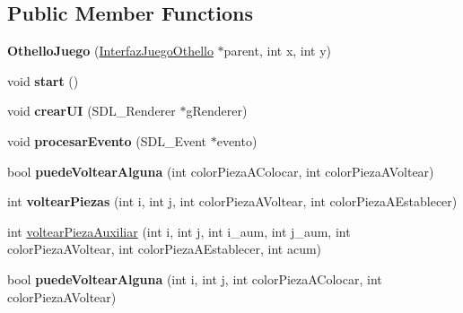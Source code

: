 \subsection*{Public Member Functions}
\begin{DoxyCompactItemize}
\item 
{\bfseries Othello\+Juego} (\hyperlink{class_interfaz_juego_othello}{Interfaz\+Juego\+Othello} $\ast$parent, int x, int y)\hypertarget{class_othello_juego_ad2e03afd54f02fda63eb7d11452ac2db}{}\label{class_othello_juego_ad2e03afd54f02fda63eb7d11452ac2db}

\item 
void {\bfseries start} ()\hypertarget{class_othello_juego_a08758b59df118a4cb372b91ffb0a375e}{}\label{class_othello_juego_a08758b59df118a4cb372b91ffb0a375e}

\item 
void {\bfseries crear\+UI} (S\+D\+L\+\_\+\+Renderer $\ast$g\+Renderer)\hypertarget{class_othello_juego_a87f0de7ee9c8e630f6dd33a55bb89a7b}{}\label{class_othello_juego_a87f0de7ee9c8e630f6dd33a55bb89a7b}

\item 
void {\bfseries procesar\+Evento} (S\+D\+L\+\_\+\+Event $\ast$evento)\hypertarget{class_othello_juego_a5f22f33d7b92f67fe3b2a840202137d8}{}\label{class_othello_juego_a5f22f33d7b92f67fe3b2a840202137d8}

\item 
bool {\bfseries puede\+Voltear\+Alguna} (int color\+Pieza\+A\+Colocar, int color\+Pieza\+A\+Voltear)\hypertarget{class_othello_juego_aebef4a995b0ac04e7ba589b45986791f}{}\label{class_othello_juego_aebef4a995b0ac04e7ba589b45986791f}

\item 
int {\bfseries voltear\+Piezas} (int i, int j, int color\+Pieza\+A\+Voltear, int color\+Pieza\+A\+Establecer)\hypertarget{class_othello_juego_a60ff2a675a6144cef2668ffd61bcf08a}{}\label{class_othello_juego_a60ff2a675a6144cef2668ffd61bcf08a}

\item 
int \hyperlink{class_othello_juego_ae3055b6b0e2a8d85b5f939ecda06f6ea}{voltear\+Pieza\+Auxiliar} (int i, int j, int i\+\_\+aum, int j\+\_\+aum, int color\+Pieza\+A\+Voltear, int color\+Pieza\+A\+Establecer, int acum)
\item 
bool {\bfseries puede\+Voltear\+Alguna} (int i, int j, int color\+Pieza\+A\+Colocar, int color\+Pieza\+A\+Voltear)\hypertarget{class_othello_juego_a3ec285af566a5442bedc8fe2d89b38df}{}\label{class_othello_juego_a3ec285af566a5442bedc8fe2d89b38df}


\end{DoxyCompactItemize}
